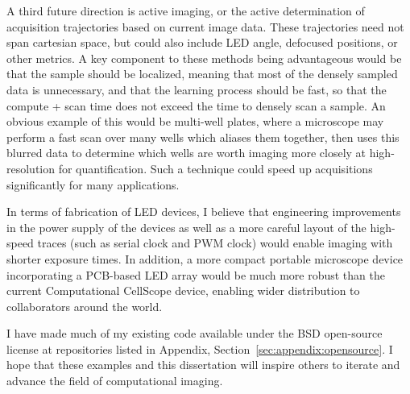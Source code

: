A third future direction is active imaging, or the active determination of acquisition trajectories based on current image data. These trajectories need not span cartesian space, but could also include LED angle, defocused positions, or other metrics. A key component to these methods being advantageous would be that the sample should be localized, meaning that most of the densely sampled data is unnecessary, and that the learning process should be fast, so that the compute + scan time does not exceed the time to densely scan a sample. An obvious example of this would be multi-well plates, where a microscope may perform a fast scan over many wells which aliases them together, then uses this blurred data to determine which wells are worth imaging more closely at high-resolution for quantification. Such a technique could speed up acquisitions significantly for many applications.

In terms of fabrication of LED devices, I believe that engineering improvements in the power supply of the devices as well as a more careful layout of the high-speed traces (such as serial clock and PWM clock) would enable imaging with shorter exposure times. In addition, a more compact portable microscope device incorporating a PCB-based LED array would be much more robust than the current Computational CellScope device, enabling wider distribution to collaborators around the world.

I have made much of my existing code available under the BSD open-source license at repositories listed in Appendix, Section~\ref{sec:appendix:opensource}. I hope that these examples and this dissertation will inspire others to iterate and advance the field of computational imaging.
